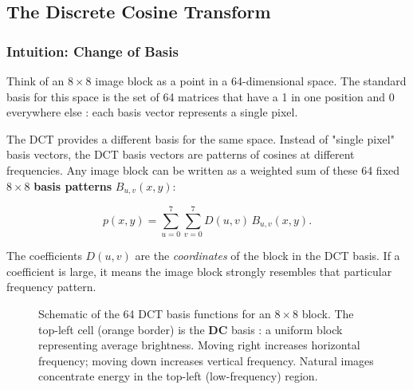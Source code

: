 \subsection{The Discrete Cosine Transform}

\subsubsection{Intuition: Change of Basis}

Think of an $8\times8$ image block as a point in a 64-dimensional space. The standard basis for this space is the set of 64 matrices that have a 1 in one position and 0 everywhere else : each basis vector represents a single pixel.

The DCT provides a different basis for the same space. Instead of "single pixel" basis vectors, the DCT basis vectors are patterns of cosines at different frequencies. Any image block can be written as a weighted sum of these 64 fixed $8\times8$ \textbf{basis patterns} $B_{u,v}(x,y)$:

\[
p(x,y) = \sum_{u=0}^{7}\sum_{v=0}^{7} D(u,v)\,B_{u,v}(x,y).
\]

The coefficients $D(u,v)$ are the \emph{coordinates} of the block in the DCT basis. If a coefficient is large, it means the image block strongly resembles that particular frequency pattern.

\begin{figure}[H]
\centering
{}
\caption{Schematic of the 64 DCT basis functions for an $8\times8$ block. The top-left cell (orange border) is the \textbf{DC} basis : a uniform block representing average brightness. Moving right increases horizontal frequency; moving down increases vertical frequency. Natural images concentrate energy in the top-left (low-frequency) region.}
\label{fig:basis}
\end{figure}

